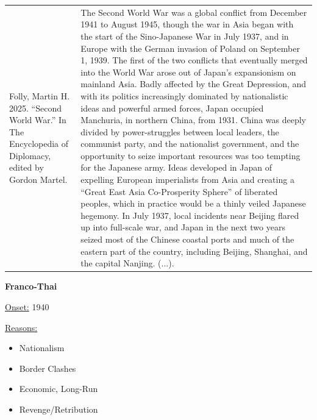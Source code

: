 {\begin{longtable}{p{}p{}}
\\
Folly, Martin H. 2025. “Second World War.” In The Encyclopedia of Diplomacy, edited by Gordon Martel. & The Second World War was a global conflict from December 1941 to August 1945, though the war in Asia began with the start of the Sino-Japanese War in July 1937, and in Europe with the German invasion of Poland on September 1, 1939. The first of the two conflicts that eventually merged into the World War arose out of Japan's expansionism on mainland Asia. Badly affected by the Great Depression, and with its politics increasingly dominated by nationalistic ideas and powerful armed forces, Japan occupied Manchuria, in northern China, from 1931. China was deeply divided by power-struggles between local leaders, the communist party, and the nationalist government, and the opportunity to seize important resources was too tempting for the Japanese army. Ideas developed in Japan of expelling European imperialists from Asia and creating a “Great East Asia Co-Prosperity Sphere” of liberated peoples, which in practice would be a thinly veiled Japanese hegemony. In July 1937, local incidents near Beijing flared up into full-scale war, and Japan in the next two years seized most of the Chinese coastal ports and much of the eastern part of the country, including Beijing, Shanghai, and the capital Nanjing. (...).

\\
\end{longtable}}
\clearpage
         \textbf{Franco-Thai} 

          \underline{Onset:} 1940         

\underline{Reasons:}
\begin{itemize}
\item Nationalism
\item Border Clashes
\item Economic, Long-Run
\item Revenge/Retribution
\end{itemize}

